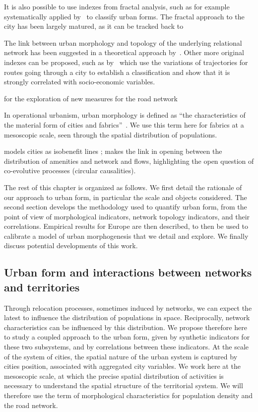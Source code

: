 It is also possible to use indexes from fractal analysis, such as for example systematically applied by~\cite{2016arXiv160808839C} to classify urban forms. The fractal approach to the city has been largely matured, as it can be tracked back to \cite{batty1994fractal}

The link between urban morphology and topology of the underlying relational network has been suggested in a theoretical approach by~\cite{badariotti2007conception}. Other more original indexes can be proposed, such as by~\cite{lee2017morphology} which use the variations of trajectories for routes going through a city to establish a classification and show that it is strongly correlated with socio-economic variables.

\cite{2015arXiv151201268L} for the exploration of new measures for the road network

In operational urbanism, urban morphology is defined as ``the characteristics of the material form of cities and fabrics''~\cite{paquot2010abc}. We use this term here for fabrics at a mesoscopic scale, seen through the spatial distribution of populations.


\cite{d2015mathematize} models cities as isobenefit lines ; makes the link in opening between the distribution of amenities and network and flows, highlighting the open question of co-evolutive processes (circular causalities).


The rest of this chapter is organized as follows. We first detail the rationale of our approach to urban form, in particular the scale and objects considered. The second section develops the methodology used to quantify urban form, from the point of view of morphological indicators, network topology indicators, and their correlations. Empirical results for Europe are then described, to then be used to calibrate a model of urban morphogenesis that we detail and explore. We finally discuss potential developments of this work.


\subsection{Urban form and interactions between networks and territories}

Through relocation processes, sometimes induced by networks, we can expect the latest to influence the distribution of populations in space. Reciprocally, network characteristics can be influenced by this distribution. We propose therefore here to study a coupled approach to the urban form, given by synthetic indicators for these two subsystems, and by correlations between these indicators. At the scale of the system of cities, the spatial nature of the urban system is captured by cities position, associated with aggregated city variables. We work here at the mesoscopic scale, at which the precise spatial distribution of activities is necessary to understand the spatial structure of the territorial system. We will therefore use the term of morphological characteristics for population density and the road network.

